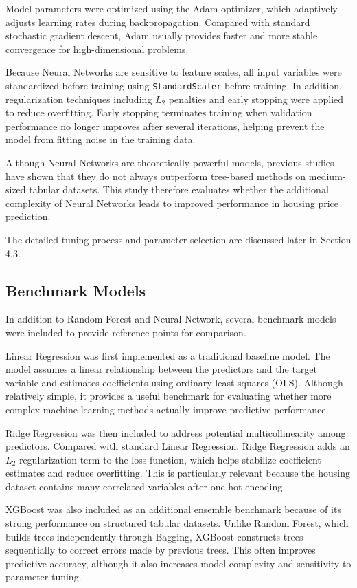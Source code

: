 \documentclass[12pt,a4paper,oneside,openany]{book}
\begin{document}
Model parameters were optimized using the Adam optimizer, which adaptively adjusts learning rates during backpropagation. Compared with standard stochastic gradient descent, Adam usually provides faster and more stable convergence for high-dimensional problems.

Because Neural Networks are sensitive to feature scales, all input variables were standardized before training using \texttt{StandardScaler} before training. In addition, regularization techniques including $L_2$ penalties and early stopping were applied to reduce overfitting. Early stopping terminates training when validation performance no longer improves after several iterations, helping prevent the model from fitting noise in the training data.

Although Neural Networks are theoretically powerful models, previous studies have shown that they do not always outperform tree-based methods on medium-sized tabular datasets. This study therefore evaluates whether the additional complexity of Neural Networks leads to improved performance in housing price prediction.

The detailed tuning process and parameter selection are discussed later in Section 4.3.


\subsection{Benchmark Models}

In addition to Random Forest and Neural Network, several benchmark models were included to provide reference points for comparison.

Linear Regression was first implemented as a traditional baseline model. The model assumes a linear relationship between the predictors and the target variable and estimates coefficients using ordinary least squares (OLS). Although relatively simple, it provides a useful benchmark for evaluating whether more complex machine learning methods actually improve predictive performance.

Ridge Regression was then included to address potential multicollinearity among predictors. Compared with standard Linear Regression, Ridge Regression adds an $L_2$ regularization term to the loss function, which helps stabilize coefficient estimates and reduce overfitting. This is particularly relevant because the housing dataset contains many correlated variables after one-hot encoding.

XGBoost was also included as an additional ensemble benchmark because of its strong performance on structured tabular datasets. Unlike Random Forest, which builds trees independently through Bagging, XGBoost constructs trees sequentially to correct errors made by previous trees. This often improves predictive accuracy, although it also increases model complexity and sensitivity to parameter tuning.
\end{document}
